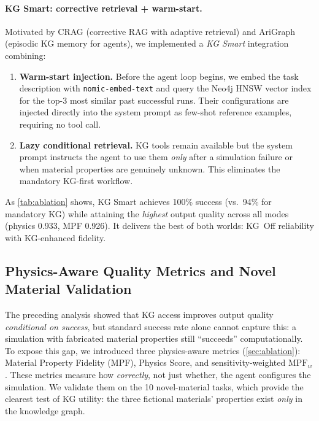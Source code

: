 \documentclass[preprint,review,12pt]{elsarticle}
\begin{document}
\paragraph{KG Smart: corrective retrieval + warm-start.}
Motivated by CRAG \citep{yan2024crag} (corrective RAG with adaptive
retrieval) and AriGraph \citep{arigraph2024} (episodic KG memory for
agents), we implemented a \emph{KG Smart} integration combining:
\begin{enumerate}
  \item \textbf{Warm-start injection.} Before the agent loop begins, we embed
        the task description with \texttt{nomic-embed-text} and query the Neo4j
        HNSW vector index for the top-3 most similar past successful runs.
        Their configurations are injected directly into the system prompt as
        few-shot reference examples, requiring no tool call.
  \item \textbf{Lazy conditional retrieval.} KG tools remain available but the
        system prompt instructs the agent to use them \emph{only}
        after a simulation failure or when material properties are genuinely
        unknown.  This eliminates the mandatory KG-first workflow.
\end{enumerate}

As \cref{tab:ablation} shows, KG Smart achieves 100\% success
(vs.\ 94\% for mandatory KG) while attaining the \emph{highest} output
quality across all modes (physics 0.933, MPF 0.926).  It delivers the
best of both worlds: KG~Off reliability with KG-enhanced fidelity.

\subsection{Physics-Aware Quality Metrics and Novel Material Validation}
\label{sec:novidium}

The preceding analysis showed that KG access improves output quality
\emph{conditional on success}, but standard success rate alone cannot
capture this: a simulation with fabricated material properties still
``succeeds'' computationally.  To expose this gap, we introduced three
physics-aware metrics (\cref{sec:ablation}): Material Property Fidelity
(MPF), Physics Score, and sensitivity-weighted $\text{MPF}_w$.  These
metrics measure how \emph{correctly}, not just whether, the agent
configures the simulation.  We validate them on the 10 novel-material
tasks, which provide the clearest test of KG utility: the three
fictional materials' properties exist \emph{only} in the knowledge graph.
\end{document}
